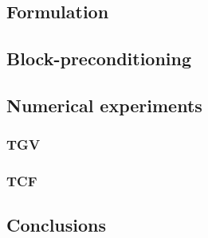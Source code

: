 \documentclass[compress,11 pt,t]{beamer}
\begin{document}
\subsection{Formulation}


\subsection{Block-preconditioning}


\subsection{Numerical experiments}

\subsubsection{TGV}

\subsubsection{TCF}

\subsection{Conclusions}

\end{document}

